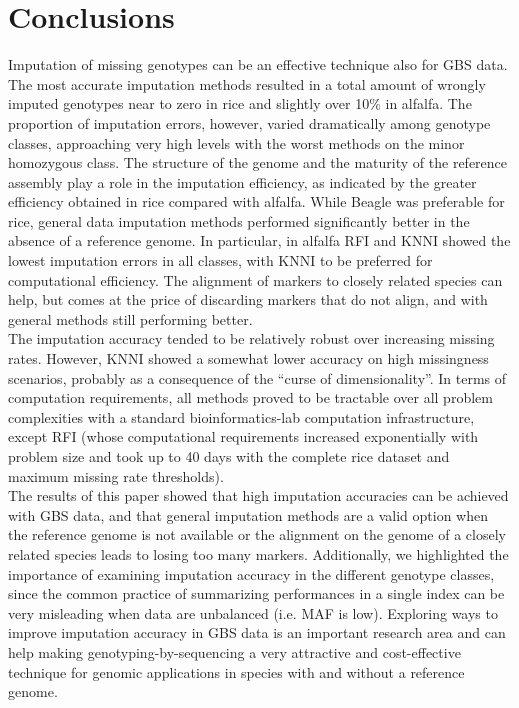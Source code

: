 \makeatletter{}\section{Conclusions}
\label{sec:conclusions}
Imputation of missing genotypes can be an effective technique also for GBS data.
The most accurate imputation methods resulted in a total amount of wrongly imputed genotypes near to zero in rice and slightly over 10\% in alfalfa. 
The proportion of imputation errors, however, varied dramatically among genotype classes, approaching very high levels with the worst methods on the minor homozygous class.
The structure of the genome and the maturity of the reference assembly play a role in the imputation efficiency, as indicated by the greater efficiency obtained in rice compared with alfalfa. While Beagle was preferable for rice, general data imputation methods performed significantly better in the absence of a reference genome. In particular, in alfalfa RFI and KNNI showed the lowest imputation errors in all classes, with KNNI to be preferred for computational efficiency. The alignment of markers to closely related species can help, but comes at the price of discarding markers that do not align, and with general methods still performing better.\\
The imputation accuracy tended to be relatively robust over increasing missing rates. However, KNNI showed a somewhat lower accuracy on high missingness scenarios, probably as a consequence of the ``curse of dimensionality''. In terms of computation requirements, all methods proved to be tractable over all problem complexities with a standard bioinformatics-lab computation infrastructure, except RFI (whose computational requirements increased exponentially with problem size and took up to 40 days with the complete rice dataset and maximum missing rate thresholds).\\


The results of this paper showed that high imputation accuracies can be achieved with GBS data, and that general imputation methods are a valid option when the reference genome is not available or the alignment on the genome of a closely related species leads to losing too many markers. Additionally, we highlighted the importance of examining imputation accuracy in the different genotype classes, since the common practice of summarizing performances in a single index can be very misleading when data are unbalanced (i.e. MAF is low).
Exploring ways to improve imputation accuracy in GBS data is an important research area and can help making genotyping-by-sequencing a very attractive and cost-effective technique for genomic applications in species with and without a reference genome.





